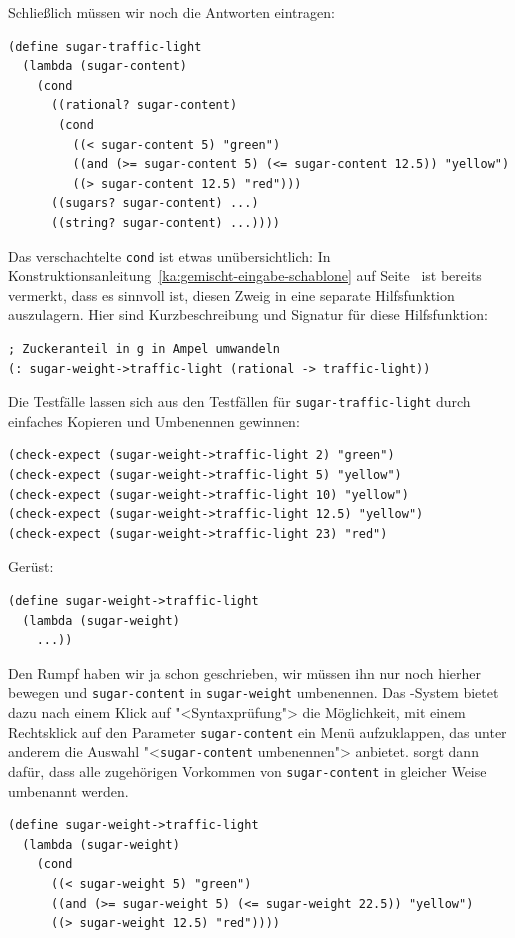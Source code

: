 %
Schließlich müssen wir noch die Antworten eintragen:
%
\begin{lstlisting}
(define sugar-traffic-light
  (lambda (sugar-content)
    (cond
      ((rational? sugar-content) 
       (cond
         ((< sugar-content 5) "green")
         ((and (>= sugar-content 5) (<= sugar-content 12.5)) "yellow")
         ((> sugar-content 12.5) "red")))
      ((sugars? sugar-content) ...)
      ((string? sugar-content) ...))))
\end{lstlisting}         
%
Das verschachtelte \lstinline{cond} ist etwas unübersichtlich: In
Konstruktionsanleitung~\ref{ka:gemischt-eingabe-schablone} auf
Seite~\pageref{page:separate-mixed-procs} ist bereits vermerkt, dass
es sinnvoll ist, diesen Zweig in eine separate Hilfsfunktion
auszulagern.  Hier sind Kurzbeschreibung und Signatur für diese
Hilfsfunktion:
%
\begin{lstlisting}
; Zuckeranteil in g in Ampel umwandeln
(: sugar-weight->traffic-light (rational -> traffic-light))
\end{lstlisting}
%
Die Testfälle lassen sich aus den Testfällen für
\lstinline{sugar-traffic-light} durch einfaches Kopieren und Umbenennen
gewinnen:
%
\begin{lstlisting}
(check-expect (sugar-weight->traffic-light 2) "green")
(check-expect (sugar-weight->traffic-light 5) "yellow")
(check-expect (sugar-weight->traffic-light 10) "yellow")
(check-expect (sugar-weight->traffic-light 12.5) "yellow")
(check-expect (sugar-weight->traffic-light 23) "red")
\end{lstlisting}
%
Gerüst:
%
\begin{lstlisting}
(define sugar-weight->traffic-light
  (lambda (sugar-weight)
    ...))
\end{lstlisting}
%
Den Rumpf haben wir ja schon geschrieben, wir müssen ihn nur noch
hierher bewegen und \lstinline{sugar-content} in \lstinline{sugar-weight} umbenennen. Das \drscheme{}-System
bietet dazu nach einem Klick auf "<Syntaxprüfung"> die Möglichkeit, mit einem
Rechtsklick auf den Parameter \lstinline{sugar-content} ein Menü aufzuklappen, das unter
anderem die Auswahl "<\lstinline{sugar-content} umbenennen"> anbietet. \drscheme{} sorgt dann
dafür, dass alle zugehörigen Vorkommen von \lstinline{sugar-content} in gleicher Weise
umbenannt werden.\label{def:sugar-weight-traffic-light}
%
\begin{lstlisting}
(define sugar-weight->traffic-light
  (lambda (sugar-weight)
    (cond
      ((< sugar-weight 5) "green")
      ((and (>= sugar-weight 5) (<= sugar-weight 22.5)) "yellow")
      ((> sugar-weight 12.5) "red"))))
\end{lstlisting}
